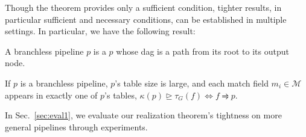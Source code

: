  Though the theorem provides only a sufficient condition, tighter results, in particular sufficient and necessary conditions, can be established in multiple settings. In particular, we have the following result:

\begin{definition} A branchless pipeline $p$ is a $p$ whose dag is a path from its root to its output node.
\end{definition}

\begin{theorem} If $p$ is a branchless pipeline, $p$'s table size is large, and each match field $m_i \in \mathcal{M}$ appears in exactly one of $p$'s tables, $\kappa(p) \trianglerighteq \tau_G(f) \Leftrightarrow f \rightrightharpoons p$.
\end{theorem}



 In Sec.~\ref{sec:eval1}, we evaluate our realization theorem's tightness on more general pipelines through experiments.




